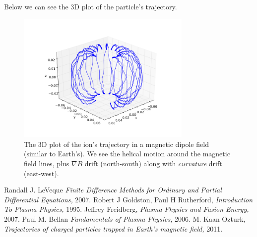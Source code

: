 \documentclass[11pt]{report}
\begin{document}
Below we can see the 3D plot of the particle's trajectory.

\begin{figure}[!ht]
  \centering
    \includegraphics[width=0.75\textwidth]{images/earth_ion3d}
     \caption{The 3D plot of the ion's trajectory in a magnetic dipole field (similar to Earth's). We see the helical motion around the magnetic field lines, plus $\nabla B$ drift (north-south) along with \emph{curvature} drift (east-west).}
\end{figure}



\begin{thebibliography}{1}

   Randall J. LeVeque {\em Finite Difference Methods for Ordinary and Partial Differential Equations, }  2007.
   Robert J Goldston, Paul H Rutherford, {\em Introduction To Plasma Physics,}  1995.
   Jeffrey Freidberg, {\em Plasma Physics and Fusion Energy,}  2007.
   Paul M. Bellan {\em Fundamentals of Plasma Physics,}  2006.
   M. Kaan Ozturk, {\em Trajectories of charged particles trapped in Earth's magnetic field,}  2011.

  \end{thebibliography}
\end{document}
